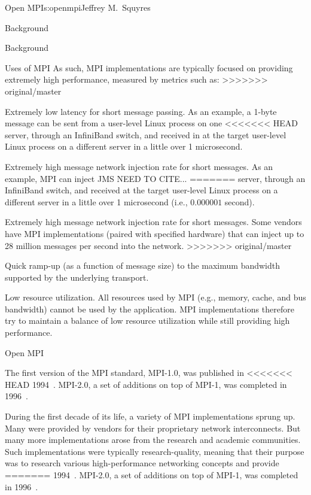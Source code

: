 \begin{aosachapter}{Open MPI}{s:openmpi}{Jeffrey M.\ Squyres}
\begin{aosasect1}{Background}
\begin{aosasect1}{Background}
\begin{aosasect2}{Uses of MPI}
As such, MPI implementations are typically focused on providing
extremely high performance, measured by metrics such as:
>>>>>>> original/master

\begin{aosaitemize}
\item Extremely low latency for short message passing.  As an example,
  a 1-byte message can be sent from a user-level Linux process on one
<<<<<<< HEAD
  server, through an InfiniBand switch, and received in at the target
  user-level Linux process on a different server in a little over 1
  microsecond.
\item Extremely high message network injection rate for short
  messages.  As an example, MPI can inject JMS NEED TO CITE...
=======
  server, through an InfiniBand switch, and received at the target
  user-level Linux process on a different server in a little over 1
  microsecond (i.e., $0.000001$ second).
\item Extremely high message network injection rate for short
  messages.  Some vendors have MPI implementations (paired with
  specified hardware) that can inject up to 28 million messages per
  second into the network.
>>>>>>> original/master
\item Quick ramp-up (as a function of message size) to the maximum
  bandwidth supported by the underlying transport.
\item Low resource utilization.  All resources used by MPI (e.g.,
  memory, cache, and bus bandwidth) cannot be used by the application.
  MPI implementations therefore try to maintain a balance of low
  resource utilization while still providing high performance.
\end{aosaitemize}

\end{aosasect2}


\begin{aosasect2}{Open MPI}

The first version of the MPI standard, MPI-1.0, was published in
<<<<<<< HEAD
1994~\cite{mpi_forum93:_mpi}.  
%
MPI-2.0, a set of additions on top of MPI-1, was completed in
1996~\cite{geist96:_mpi2_lyon}.

During the first decade of its life, a variety of MPI implementations
sprung up.  Many were provided by vendors for their proprietary
network interconnects.  But many more implementations arose from the
research and academic communities.  Such implementations were
typically research-quality, meaning that their purpose was to research
various high-performance networking concepts and provide
=======
1994~\cite{bib:mpi-forum-93}.  
MPI-2.0, a set of additions on top of MPI-1, was completed in
1996~\cite{bib:mpi-geist-96}.


\end{aosasect2}
\end{aosasect1}
\end{aosasect1}
\end{aosachapter}
